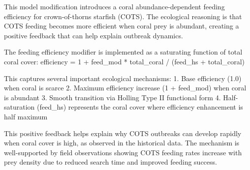 This model modification introduces a coral abundance-dependent feeding efficiency for crown-of-thorns starfish (COTS). The ecological reasoning is that COTS feeding becomes more efficient when coral prey is abundant, creating a positive feedback that can help explain outbreak dynamics.

The feeding efficiency modifier is implemented as a saturating function of total coral cover:
efficiency = 1 + feed_mod * total_coral / (feed_hs + total_coral)

This captures several important ecological mechanisms:
1. Base efficiency (1.0) when coral is scarce
2. Maximum efficiency increase (1 + feed_mod) when coral is abundant
3. Smooth transition via Holling Type II functional form
4. Half-saturation (feed_hs) represents the coral cover where efficiency enhancement is half maximum

This positive feedback helps explain why COTS outbreaks can develop rapidly when coral cover is high, as observed in the historical data. The mechanism is well-supported by field observations showing COTS feeding rates increase with prey density due to reduced search time and improved feeding success.
